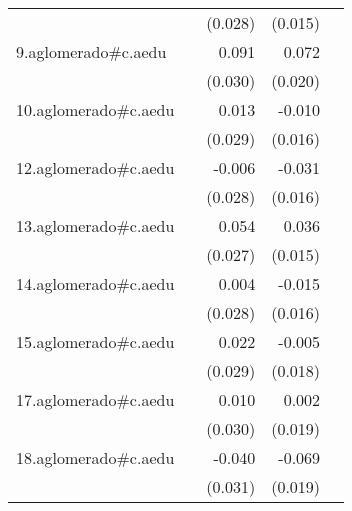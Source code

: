 {\begin{longtable}{l*{4}{D{.}{.}{-1}}}
            &                     &     (0.028)         &     (0.015)         &                     \\
\addlinespace
9.aglomerado#c.aedu&                     &       0.091\sym{**} &       0.072\sym{***}&                     \\
            &                     &     (0.030)         &     (0.020)         &                     \\
\addlinespace
10.aglomerado#c.aedu&                     &       0.013         &      -0.010         &                     \\
            &                     &     (0.029)         &     (0.016)         &                     \\
\addlinespace
12.aglomerado#c.aedu&                     &      -0.006         &      -0.031         &                     \\
            &                     &     (0.028)         &     (0.016)         &                     \\
\addlinespace
13.aglomerado#c.aedu&                     &       0.054\sym{*}  &       0.036\sym{*}  &                     \\
            &                     &     (0.027)         &     (0.015)         &                     \\
\addlinespace
14.aglomerado#c.aedu&                     &       0.004         &      -0.015         &                     \\
            &                     &     (0.028)         &     (0.016)         &                     \\
\addlinespace
15.aglomerado#c.aedu&                     &       0.022         &      -0.005         &                     \\
            &                     &     (0.029)         &     (0.018)         &                     \\
\addlinespace
17.aglomerado#c.aedu&                     &       0.010         &       0.002         &                     \\
            &                     &     (0.030)         &     (0.019)         &                     \\
\addlinespace
18.aglomerado#c.aedu&                     &      -0.040         &      -0.069\sym{***}&                     \\
            &                     &     (0.031)         &     (0.019)         &                     \\

\end{longtable}}
